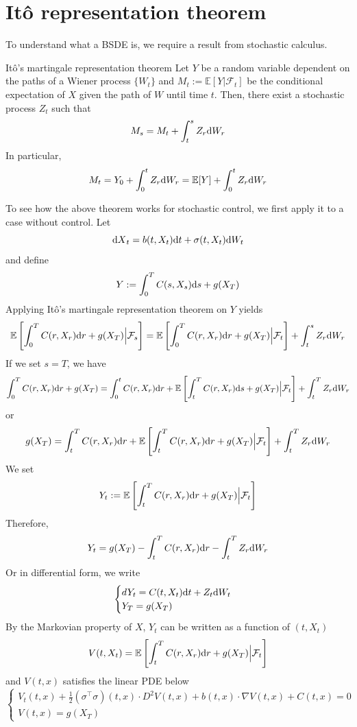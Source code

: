 \documentclass[11pt]{book}
\newcommand{\dt}{\text{\normalfont d}t}
\newcommand{\ds}{\text{\normalfont d}s}
\newcommand{\dr}{\text{\normalfont d}r}
\newcommand{\dX}{\text{\normalfont d}X}
\newcommand{\dW}{\text{\normalfont d}W}
\begin{document}
\section{Itô representation theorem}
To understand what a BSDE is, we require a result from stochastic calculus. 
\begin{thm}{Itô's martingale representation theorem}
    Let $Y$ be a random variable dependent on the paths of a Wiener process $\{W_t\}$ and $M_t:=\mathbb{E}[Y|\mathcal{F}_t]$ be the conditional expectation of $X$ given the path of $W$ until time $t$. Then, there exist a stochastic process $Z_t$ such that
    \[
    M_s=M_t+\int_t^sZ_r\dW_r
    \]
    In particular,
    \[
    M_t=Y_0+\int_0^tZ_r\dW_r=\mathbb{E}[Y]+\int_0^tZ_r\dW_r
    \]
\end{thm}
To see how the above theorem works for stochastic control, we first apply it to a case without control. Let 
\[
{\dX}_t =b(t,X_t){{\dt}}+\sigma(t,X_t)\dW_t
\]
and define
\begin{equation}
Y:=\int_0^T C(s,X_s){{\ds}}+g(X_T)
\end{equation}
Applying Itô's martingale representation theorem on $Y$ yields
\[
\mathbb{E}\left[\int_0^T C(r,X_r){{\dr}}+g(X_T)\Big|\mathcal{F}_s\right] = \mathbb{E}\left[\int_0^T C(r,X_r){{\dr}}+g(X_T)\Big|\mathcal{F}_t\right] + \int_t^sZ_r\dW_r
\]
If we set $s=T$, we have  
\[
\int_0^T C(r,X_r){{\dr}}+g(X_T) = \int_0^t C(r,X_r){{\dr}} + \mathbb{E}\left[\int_t^T C(r,X_r){{\ds}}+g(X_T)\Big|\mathcal{F}_t\right] + \int_t^T Z_r\dW_r
\]
or
\[
g(X_T) = \int_t^T C(r,X_r){{\dr}} + \mathbb{E}\left[\int_t^T C(r,X_r){{\dr}}+g(X_T)\Big|\mathcal{F}_t\right] + \int_t^T Z_r\dW_r
\]
We set
\[
Y_t:=\mathbb{E}\left[\int_t^T C(r,X_r){{\dr}}+g(X_T)\Big|\mathcal{F}_t\right]
\]
Therefore,
\[
Y_t = g(X_T) - \int_t^T C(r,X_r){{\dr}}  - \int_t^T Z_r\dW_r
\]
Or in differential form, we write
\[
\begin{cases}
    dY_t = C(t,X_t){{\dt}} + Z_t \dW_t\\
    Y_T=g(X_T)
\end{cases}
\]
    By the Markovian property of $X$, $Y_t$ can be written as a function of $(t,X_t)$
\begin{equation}
\label{eqn:F-K}
    V(t,X_t)=\mathbb{E}\left[\int_t^T C(r,X_r){{\dr}}+g(X_T)\Big|\mathcal{F}_t\right]
\end{equation}
and $V(t,x)$ satisfies the linear PDE below
\begin{equation}
\label{eqn:linear}
    \begin{cases}
    V_t(t,x)+\frac12(\sigma^{\intercal}\sigma)(t,x)\cdot D^2 V(t,x) + b(t,x)\cdot \nabla V(t,x) + C(t,x) = 0\\
    V(t,x) = g(X_T)
\end{cases}
\end{equation}
\end{document}
